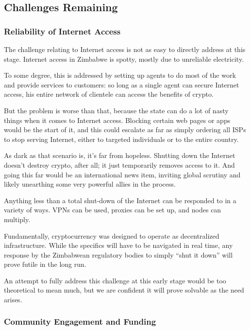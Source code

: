 \documentclass{article}
\begin{document}
\subsection{Challenges Remaining} \label{challenges remaining}

\subsubsection{Reliability of Internet Access} \label{reliable internet access}

The challenge relating to Internet access is not as easy to directly address at this stage. Internet access in Zimbabwe is spotty, mostly due to unreliable electricity.

To some degree, this is addressed by setting up agents to do most of the work and provide services to customers: so long as a single agent can secure Internet access, his entire network of clientele can access the benefits of crypto.

But the problem is worse than that, because the state can do a lot of nasty things when it comes to Internet access. Blocking certain web pages or apps would be the start of it, and this could escalate as far as simply ordering all ISPs to stop serving Internet, either to targeted individuals or to the entire country.

As dark as that scenario is, it's far from hopeless. Shutting down the Internet doesn't destroy crypto, after all; it just temporarily removes access to it. And going this far would be an international news item, inviting global scrutiny and likely unearthing some very powerful allies in the process.

Anything less than a total shut-down of the Internet can be responded to in a variety of ways. VPNs can be used, proxies can be set up, and nodes can multiply.

Fundamentally, cryptocurrency was designed to operate as decentralized infrastructure. While the specifics will have to be navigated in real time, any response by the Zimbabwean regulatory bodies to simply ``shut it down'' will prove futile in the long run.

An attempt to fully address this challenge at this early stage would be too theoretical to mean much, but we are confident it will prove solvable as the need arises.

\subsubsection{Community Engagement and Funding} \label{community funding}
\end{document}
